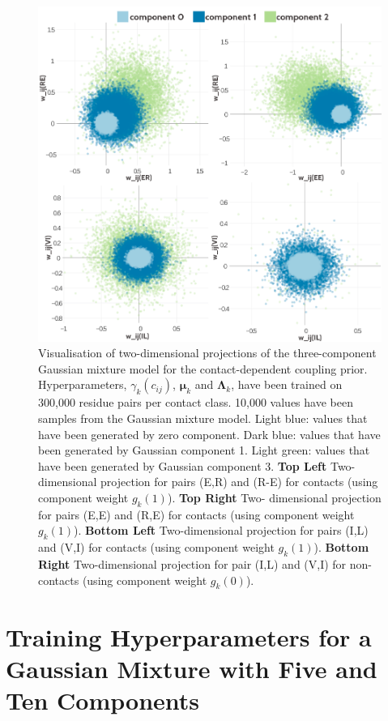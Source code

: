 \documentclass[11pt,a4paper,twoside]{book}
\newcommand{\Lk}{\mathbf{\Lambda}_k}
\newcommand{\muk}{\mathbf{\mu}_k}
\newcommand{\cij}{c_{ij}}
\theoremstyle{definition}
\theoremstyle{definition}
\theoremstyle{remark}
\begin{document}
\begin{figure}
\includegraphics[width=1\linewidth]{img/bayesian_model/pll/3/2dvis_combined_300k} \caption{Visualisation of two-dimensional
projections of the three-component Gaussian mixture model for the
contact-dependent coupling prior. Hyperparameters, \(\gamma_k(\cij)\),
\(\muk\) and \(\Lk\), have been trained on 300,000 residue pairs per
contact class. 10,000 values have been samples from the Gaussian mixture
model. Light blue: values that have been generated by zero component.
Dark blue: values that have been generated by Gaussian component 1.
Light green: values that have been generated by Gaussian component 3.
\textbf{Top Left} Two-dimensional projection for pairs (E,R) and (R-E)
for contacts (using component weight \(g_k(1)\)). \textbf{Top Right}
Two- dimensional projection for pairs (E,E) and (R,E) for contacts
(using component weight \(g_k(1)\)). \textbf{Bottom Left}
Two-dimensional projection for pairs (I,L) and (V,I) for contacts (using
component weight \(g_k(1)\)). \textbf{Bottom Right} Two-dimensional
projection for pair (I,L) and (V,I) for non-contacts (using component
weight \(g_k(0)\)).}\label{fig:vis2d-pll-3comp-300k}
\end{figure}

\section{Training Hyperparameters for a Gaussian Mixture with Five and
Ten
Components}\label{training-hyperparameters-for-a-gaussian-mixture-with-five-and-ten-components}
\end{document}
